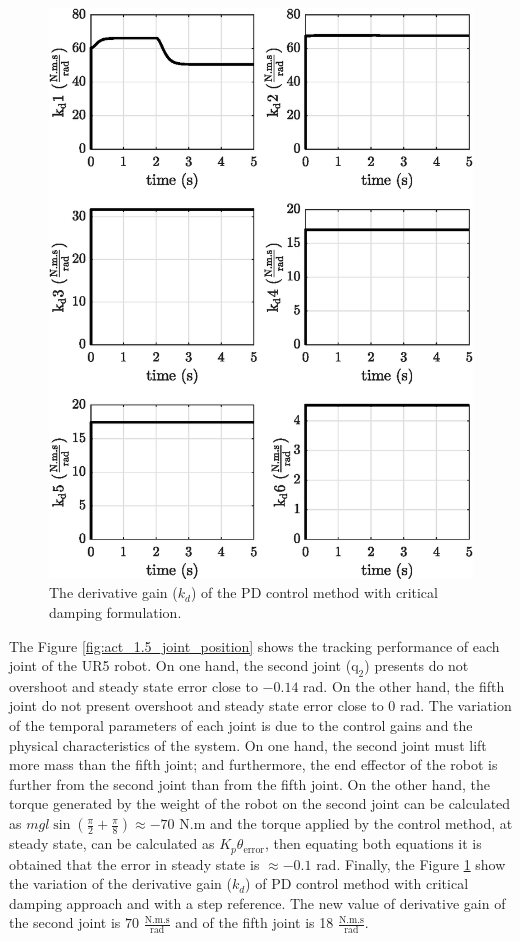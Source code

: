\begin{figure}
    \centering
    \includegraphics{images/act_1.5/kd.eps}
    \caption{The derivative gain ($k_d$) of the PD control method with critical damping formulation.}
    \label{fig:act_1.5_k_d}
\end{figure}


The Figure \ref{fig:act_1.5_joint_position} shows the tracking performance of each joint of the UR5 robot. On one hand, the second joint ($\mathrm{q}_2$) presents do not overshoot and steady state error close to $-0.14$ rad. On the other hand, the fifth joint do not present overshoot and steady state error close to $0$ rad. The variation of the temporal parameters of each joint is due to the control gains and the physical characteristics of the system. On one hand, the second joint must lift more mass than the fifth joint; and furthermore, the end effector of the robot is further from the second joint than from the fifth joint. On the other hand, the torque generated by the weight of the robot on the second joint can be calculated as $m g l \sin({\frac{\pi}{2} + \frac{\pi}{8}}) \approx -70$ N.m and the torque applied by the control method, at steady state, can be calculated as $K_p \theta_{\mathrm{error}}$, then equating both equations it is obtained that the error in steady state is $\approx -0.1$ rad. Finally, the Figure \ref{fig:act_1.5_k_d} show the variation of the derivative gain ($k_d$) of PD control method with critical damping approach and with a step reference. The new value of derivative gain of the second joint is $70$ $\mathrm{\frac{N.m.s}{rad}}$ and of the fifth joint is 18 $\mathrm{\frac{N.m.s}{rad}}$. 